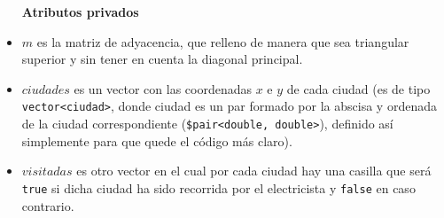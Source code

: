 \documentclass[12pt]{article}
\begin{document}
\begin{itemize}[wide, nosep, labelindent = 0pt, topsep = 1ex]
\item[\textbf{Atributos privados}]
\item $m$ es la matriz de adyacencia, que relleno de manera que sea triangular superior y sin tener en cuenta la diagonal principal.
\item $ciudades$ es un vector con las coordenadas $x$ e $y$ de cada ciudad (es de tipo \verb|vector<ciudad>|, donde ciudad es un par formado por la abscisa y ordenada de la ciudad correspondiente (\verb|$pair<double, double>|), definido así simplemente para que quede el código más claro).
\item $visitadas$ es otro vector en el cual por cada ciudad hay una casilla que será \verb|true| si dicha ciudad ha sido recorrida por el electricista y \verb|false| en caso contrario.
\end{itemize}
\end{document}
